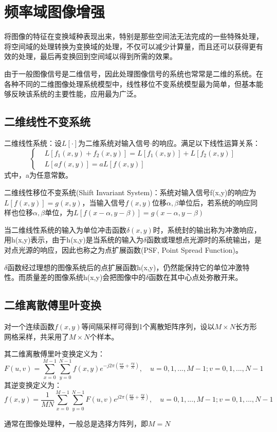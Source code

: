\documentclass[11pt]{article}
\begin{document}
\section{频率域图像增强}
将图像的特征在变换域种表现出来，特别是那些空间法无法完成的一些特殊处理，将空间域的处理转换为变换域的处理，不仅可以减少计算量，而且还可以获得更有效的处理，最后再变换回到空间域以得到所需的效果。

由于一般图像信号是二维信号，因此处理图像信号的系统也常常是二维的系统。在各种不同的二维图像处理系统模型中，线性移位不变系统模型最为简单，但基本能够反映该系统的主要性能，应用最为广泛。

\subsection{二维线性不变系统}
二维线性系统：设$L[\cdot]$为二维系统对输入信号$\cdot$的响应。满足以下线性运算关系：
$$
\begin{cases}
	& L[f_1(x,y)+f_2(x,y)] = L[f_1(x,y)]+L[f_2(x,y)] \\ 
	& L[af(x,y)] = aL[f(x,y)]
\end{cases}
$$
式中，a为任意常数。

二维线性移位不变系统(Shift Invariant System)：系统对输入信号f(x,y)的响应为$L[f(x,y)]=g(x,y)$，当输入信号$f(x,y)$位移$\alpha,\beta$单位后，若系统的响应同样也位移$\alpha,\beta$单位，为$L[f(x-\alpha,y-\beta)] = g(x-\alpha,y-\beta)$

当二维线性系统的输入为单位冲击函数$\delta(x,y)$时，系统封的输出称为冲激响应，用h(x,y)表示，由于h(x,y)是当系统的输入为$\delta$函数或理想点光源时的系统输出，是对点光源的响应，因此也称之为点扩展函数(PSF, Point Spread Function)。

$\delta$函数经过理想的图像系统后的点扩展函数h(x,y)，仍然能保持它的单位冲激特性。而质量差的图像系统h(x,y)会把图像中的$\delta$函数在其中心点处弥散开来。
\subsection{二维离散傅里叶变换}
对一个连续函数$f(x,y)$等间隔采样可得到1个离散矩阵序列，设以$M\times N$长方形网格采样，共采用了$M\times N$个样本。

其二维离散傅里叶变换定义为：
$$F(u,v) = \sum_{x=0}^{M-1}\sum_{y=0}^{N-1}f(x,y)e^{-j2\pi(\frac{ux}{M}+\frac{vy}{N})},\quad u=0,1,...,M-1; v= 0,1,...,N-1$$
其逆变换定义为：
$$f(x,y) =\frac{1}{MN} \sum_{x=0}^{M-1}\sum_{y=0}^{N-1}F(u,v)e^{j2\pi(\frac{ux}{M}+\frac{vy}{N})},\quad u=0,1,...,M-1; v= 0,1,...,N-1$$

通常在图像处理种，一般总是选择方阵列，即$M=N$
\end{document}
